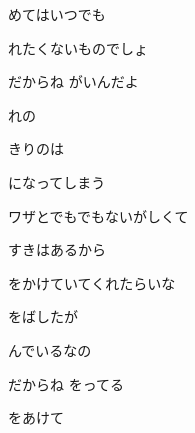 \documentclass[14pt]{ltjsarticle}
\begin{document}
{  めてはいつでも
  \jisho{}

  れたくないものでしょ
  \jisho{}

  だからね がいんだよ
  \jisho{}

\item
  れの
  \jisho{}

  きりのは
  \jisho{}

  になってしまう
  \jisho{}

  ワザとでもでもないがしくて
  \jisho{}

\item
  すきはあるから
  \jisho{}

  をかけていてくれたらいな
  \jisho{}

  をばしたが
  \jisho{}

   んでいるなの
  \jisho{}

  だからね をってる
  \jisho{}

\item
  をあけて
  \jisho{}

}
\end{document}
